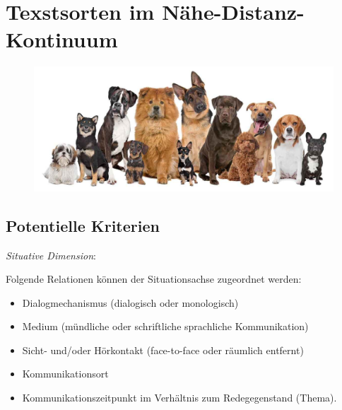 \documentclass[
  letterpaper,
]{scrbook}
\providecommand{\tightlist}{%
  \setlength{\itemsep}{0pt}\setlength{\parskip}{0pt}}\usepackage{longtable,booktabs,array}
\begin{document}
\hypertarget{texstsorten-im-nuxe4he-distanz-kontinuum}{%
\chapter{Texstsorten im
Nähe-Distanz-Kontinuum}\label{texstsorten-im-nuxe4he-distanz-kontinuum}}

\begin{figure}

{\centering 

\href{https://pethelpful.com/dogs/Finding-the-Right-Dog-Breed}{\includegraphics[width=1\textwidth,height=\textheight]{./pictures/finding-the-right-dog-breed.jpg}}

}

\end{figure}

\hypertarget{potentielle-kriterien}{%
\section{Potentielle Kriterien}\label{potentielle-kriterien}}

\emph{Situative Dimension}:

Folgende Relationen können der Situationsachse zugeordnet werden:

\begin{itemize}
\tightlist
\item
  Dialogmechanismus (dialogisch oder monologisch)\\
\item
  Medium (mündliche oder schriftliche sprachliche Kommunikation)\\
\item
  Sicht- und/oder Hörkontakt (face-to-face oder räumlich entfernt)\\
\item
  Kommunikationsort\\
\item
  Kommunikationszeitpunkt im Verhältnis zum Redegegenstand (Thema).\\
\end{itemize}
\end{document}
